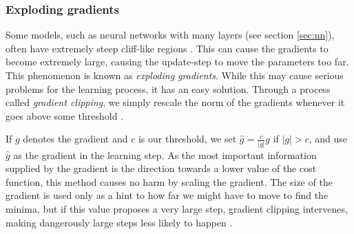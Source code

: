 \subsubsection{Exploding gradients}\label{sec:exploding_gradients}
Some models, such as neural networks with many layers (see section \ref{sec:nn}), often have extremely steep cliff-like regions \citep[p. 285]{Goodfellow-et-al-2016}.
This can cause the gradients to become extremely large, causing the update-step to move the parameters too far.
This phenomenon is known as \textit{exploding gradients}.
While this may cause serious problems for the learning process, it has an easy solution.
Through a process called \textit{gradient clipping}, we simply rescale the norm of the gradients whenever it goes above some threshold \citep[p. 93]{Ketkar2017}.

If $g$ denotes the gradient and $c$ is our threshold, we set $\hat{g} = \frac{c}{|g|}g$ if $|g|>c$, and use $\hat{g}$ as the gradient in the learning step.
As the most important information supplied by the gradient is the direction towards a lower value of the cost function, this method causes no harm by scaling the gradient.
The size of the gradient is used only as a hint to how far we might have to move to find the minima, but if this value proposes a very large step, gradient clipping intervenes, making dangerously large steps less likely to happen \citep[p. 286]{Goodfellow-et-al-2016}.

